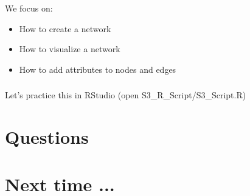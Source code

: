 \documentclass[8pt]{beamer}
\begin{document}

\begin{frame}
\frametitle{\insertsection}

We focus on:
\begin{itemize}
\item How to create a network
\item How to visualize a network
\item How to add attributes to nodes and edges
\end{itemize}

\end{frame}


\begin{frame}
\frametitle{\insertsection}

Let's practice this in RStudio (open S3\_R\_Script/S3\_Script.R)

\end{frame}

 







\section*{Questions}

\bgroup
{}
\begin{frame}[plain]{}
\begin{center}
\color{white}{\Huge\insertsection}
\end{center}
\end{frame}
\egroup






\section*{Next time ...}
\end{document}

